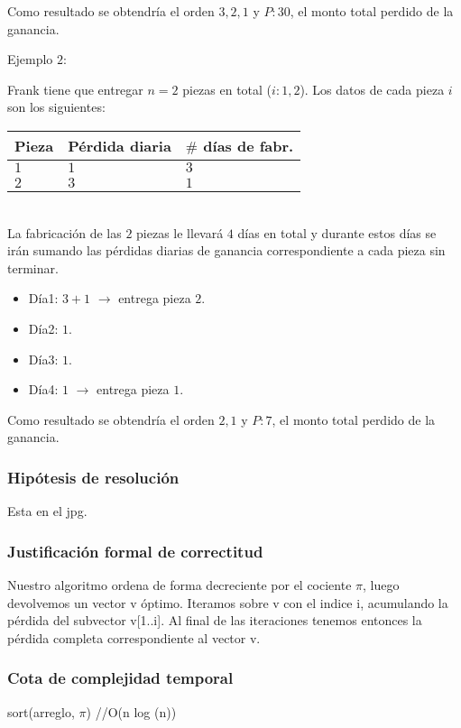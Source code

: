 \documentclass[11pt, a4paper, twoside]{article}
\begin{document}
Como resultado se obtendr\'ia el orden $3,2,1$ y $P:30$, el monto total perdido de la ganancia. \\

\begin{itemize}
Ejemplo $2$: 
\end{itemize}

Frank tiene que entregar $n=2$ piezas en total ($i:1,2$). Los datos de cada pieza $i$ son los siguientes: \\

\begin{tabular}{|l|l|l|}
\hline
Pieza &  Pérdida diaria & $\#$ días de fabr.\\
\hline
$1$   &     $1$         & $3$               \\
\hline 
$2$   &     $3$         & $1$               \\
\hline 
\end{tabular} \\ 
    
La fabricaci\'on de las $2$ piezas le llevar\'a $4$ d\'ias en total y durante estos d\'ias se ir\'an sumando las p\'erdidas diarias de ganancia correspondiente a cada pieza sin terminar. 

\begin{itemize}
\item D\'ia1: $3+1$ $\rightarrow$ entrega pieza $2$. 
\item D\'ia2: $1$. 
\item D\'ia3: $1$.
\item D\'ia4: $1$ $\rightarrow$ entrega pieza $1$.
\end{itemize}  	
	
Como resultado se obtendr\'ia el orden $2,1$ y $P:7$, el monto total perdido de la ganancia. 

\subsubsection{Hipótesis de resolución}
Esta en el jpg.
\subsubsection{Justificación formal de correctitud}
Nuestro algoritmo ordena de forma decreciente por el cociente $\pi$, luego devolvemos un vector v \'optimo. Iteramos sobre v con el indice i, acumulando la p\'erdida del subvector v[1..i]. Al final de las iteraciones tenemos entonces la p\'erdida completa correspondiente al vector v.
\subsubsection{Cota de complejidad temporal}
sort(arreglo, $\pi$) //O(n log (n))
\end{document}
